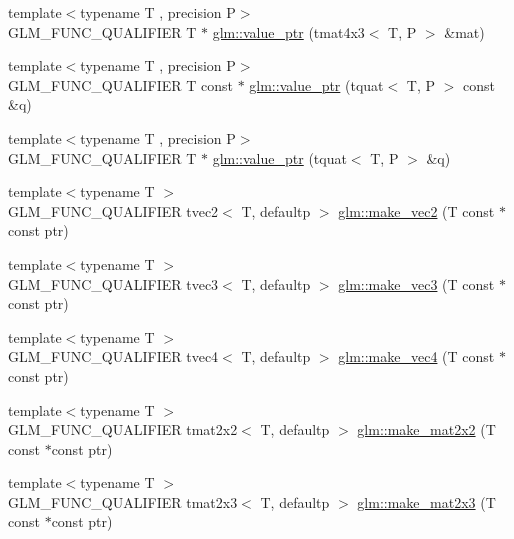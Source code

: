 \begin{DoxyCompactItemize}
\item 
{\footnotesize template$<$typename T , precision P$>$ }\\G\+L\+M\+\_\+\+F\+U\+N\+C\+\_\+\+Q\+U\+A\+L\+I\+F\+I\+E\+R T $\ast$ \hyperlink{group__gtc__type__ptr_gab9cba81cd8a7eb0afc9ac2b9f4fe05ca}{glm\+::value\+\_\+ptr} (tmat4x3$<$ T, P $>$ \&mat)
\item 
{\footnotesize template$<$typename T , precision P$>$ }\\G\+L\+M\+\_\+\+F\+U\+N\+C\+\_\+\+Q\+U\+A\+L\+I\+F\+I\+E\+R T const $\ast$ \hyperlink{group__gtc__type__ptr_ga26a38ff14840b35c57fa937711c5168c}{glm\+::value\+\_\+ptr} (tquat$<$ T, P $>$ const \&q)
\item 
{\footnotesize template$<$typename T , precision P$>$ }\\G\+L\+M\+\_\+\+F\+U\+N\+C\+\_\+\+Q\+U\+A\+L\+I\+F\+I\+E\+R T $\ast$ \hyperlink{group__gtc__type__ptr_ga637414d7a9e8877e66a59f3b3d700898}{glm\+::value\+\_\+ptr} (tquat$<$ T, P $>$ \&q)
\item 
{\footnotesize template$<$typename T $>$ }\\G\+L\+M\+\_\+\+F\+U\+N\+C\+\_\+\+Q\+U\+A\+L\+I\+F\+I\+E\+R tvec2$<$ T, defaultp $>$ \hyperlink{group__gtc__type__ptr_ga5f7393c30970c5949be13ceb525093a6}{glm\+::make\+\_\+vec2} (T const $\ast$const ptr)
\item 
{\footnotesize template$<$typename T $>$ }\\G\+L\+M\+\_\+\+F\+U\+N\+C\+\_\+\+Q\+U\+A\+L\+I\+F\+I\+E\+R tvec3$<$ T, defaultp $>$ \hyperlink{group__gtc__type__ptr_ga86f4bc63570db86346db2e567fb760f6}{glm\+::make\+\_\+vec3} (T const $\ast$const ptr)
\item 
{\footnotesize template$<$typename T $>$ }\\G\+L\+M\+\_\+\+F\+U\+N\+C\+\_\+\+Q\+U\+A\+L\+I\+F\+I\+E\+R tvec4$<$ T, defaultp $>$ \hyperlink{group__gtc__type__ptr_ga152345176b8951c15711f6ed4f6fc237}{glm\+::make\+\_\+vec4} (T const $\ast$const ptr)
\item 
{\footnotesize template$<$typename T $>$ }\\G\+L\+M\+\_\+\+F\+U\+N\+C\+\_\+\+Q\+U\+A\+L\+I\+F\+I\+E\+R tmat2x2$<$ T, defaultp $>$ \hyperlink{group__gtc__type__ptr_gadb29e510762e1042069cb28bf24ae990}{glm\+::make\+\_\+mat2x2} (T const $\ast$const ptr)
\item 
{\footnotesize template$<$typename T $>$ }\\G\+L\+M\+\_\+\+F\+U\+N\+C\+\_\+\+Q\+U\+A\+L\+I\+F\+I\+E\+R tmat2x3$<$ T, defaultp $>$ \hyperlink{group__gtc__type__ptr_ga37988c6dd941f617cdfab86d54375fc1}{glm\+::make\+\_\+mat2x3} (T const $\ast$const ptr)

\end{DoxyCompactItemize}
